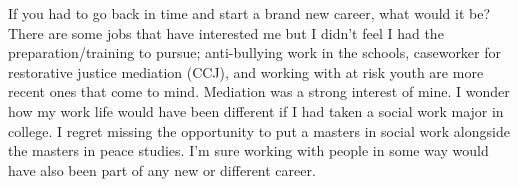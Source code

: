 If you had to go back in time and start a brand new career, what would it be?
There are some jobs that have interested me but I didn't feel I had the preparation/training to pursue; anti-bullying work in the schools, caseworker for restorative justice mediation (CCJ), and working with at risk youth are more recent ones that come to mind. Mediation was a strong interest of mine. I wonder how my work life would have been different if I had taken a social work major in college. I regret missing the opportunity to put a masters in social work alongside the masters in peace studies. I'm sure working with people in some way would have also been part of any new or different career.





